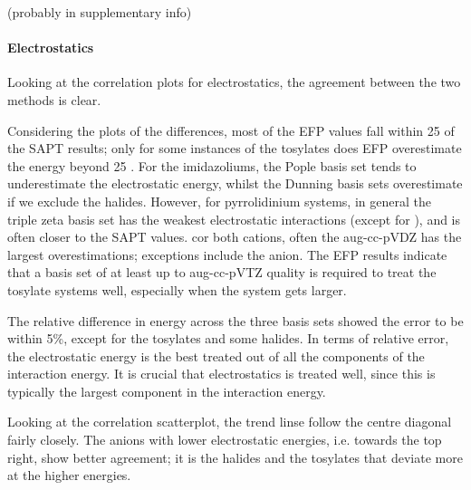 (probably in supplementary info)






\paragraph{Electrostatics}
Looking at the correlation plots for electrostatics, the agreement between the two methods is clear.

Considering the plots of the differences, most of the EFP values fall within 25 \enUnit of the SAPT results; only for some instances of the tosylates does EFP overestimate the energy beyond 25 \enUnit. 
For the imidazoliums, the Pople basis set tends to underestimate the electrostatic energy, whilst the Dunning basis sets overestimate if we exclude the halides.
However, for pyrrolidinium systems, in general the triple zeta basis set has the weakest electrostatic interactions (except for \ntf), and is often closer to the SAPT values.
cor both cations, often the aug-cc-pVDZ has the largest overestimations; exceptions include the \ntf anion. 
The EFP results indicate that a basis set of at least up to aug-cc-pVTZ quality is required to treat the tosylate systems well, especially when the system gets larger. 


The relative difference in energy across the three basis sets showed the error to be within 5\%, except for the tosylates and some halides.
In terms of relative error, the electrostatic energy is the best treated out of all the components of the interaction energy.
It is crucial that electrostatics is treated well, since this is typically the largest component in the interaction energy. 


Looking at the correlation scatterplot, the trend linse follow the centre diagonal fairly closely.
The anions with lower electrostatic energies, i.e. towards the top right, show better agreement; it is the halides and the tosylates that deviate more at the higher energies.


